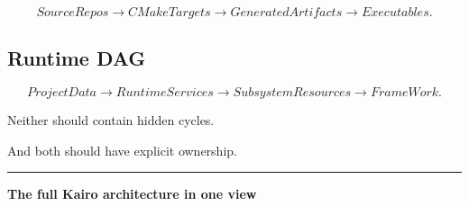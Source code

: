 \hypertarget{05-engine-i-ch012-build-dag}{}

\[
SourceRepos
\rightarrow
CMakeTargets
\rightarrow
GeneratedArtifacts
\rightarrow
Executables.
\]

\subsection{Runtime DAG}\label{05-engine-i-ch012-runtime-dag}

\hypertarget{05-engine-i-ch012-runtime-dag}{}

\[
ProjectData
\rightarrow
RuntimeServices
\rightarrow
SubsystemResources
\rightarrow
FrameWork.
\]

Neither should contain hidden cycles.

And both should have explicit ownership.

\begin{center}\rule{0.5\linewidth}{0.5pt}\end{center}

\textbf{The full Kairo architecture in one view}


